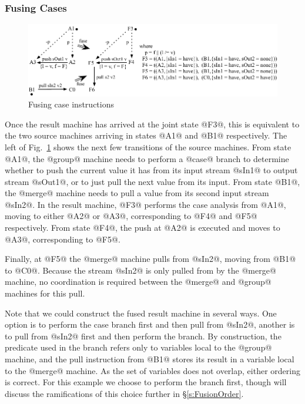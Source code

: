 \subsubsection{Fusing Cases}
\begin{figure}
\includegraphics[scale=1.1]{figures/fuse-case-pull.pdf}
\caption{Fusing case instructions}
\label{fig:Fusion:Case}
\end{figure}

Once the result machine has arrived at the joint state @F3@, this is equivalent to the two source machines arriving in states @A1@ and @B1@ respectively. The left of Fig.~\ref{fig:Fusion:Case} shows the next few transitions of the source machines. From state @A1@, the @group@ machine needs to perform a @case@ branch to determine whether to push the current value it has from its input stream @sIn1@ to output stream @sOut1@, or to just pull the next value from its input. From state @B1@, the @merge@ machine needs to pull a value from its second input stream @sIn2@. In the result machine, @F3@ performs the case analysis from @A1@, moving to either @A2@ or @A3@, corresponding to @F4@ and @F5@ respectively. From state @F4@, the push at @A2@ is executed and moves to @A3@, corresponding to @F5@.

Finally, at @F5@ the @merge@ machine pulls from @sIn2@, moving from @B1@ to @C0@.
Because the stream @sIn2@ is only pulled from by the @merge@ machine, no coordination is required between the @merge@ and @group@ machines for this pull.

Note that we could construct the fused result machine in several ways. One option is to perform the case branch first and then pull from @sIn2@, another is to pull from @sIn2@ first and then perform the branch. By construction, the predicate used in the branch refers only to variables local to the @group@ machine, and the pull instruction from @B1@ stores its result in a variable local to the @merge@ machine. As the set of variables does not overlap, either ordering is correct. For this example we choose to perform the branch first, though will discuss the ramifications of this choice further in \S\ref{s:FusionOrder}. 


